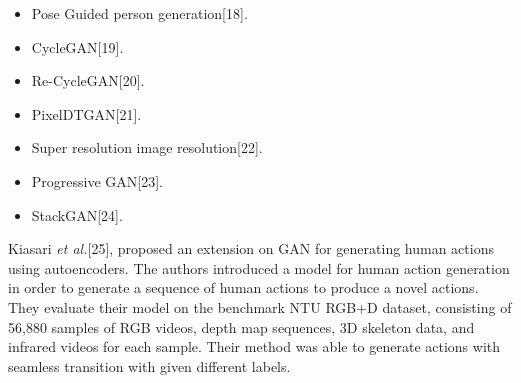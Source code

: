 \begin{itemize}
    \item Pose Guided person generation[18].
    \item CycleGAN[19].
    \item Re-CycleGAN[20].
    \item PixelDTGAN[21].
    \item Super resolution image resolution[22].
    \item Progressive GAN[23].
    \item StackGAN[24].
\end{itemize}
\hspace{5mm} Kiasari \textit{et al.}[25], proposed an extension on GAN for generating human actions using autoencoders. The authors introduced a model for human action generation in order to generate a sequence of human actions to produce a novel actions. They evaluate their model on the benchmark NTU RGB+D dataset, consisting of 56,880 samples of RGB videos, depth map sequences, 3D skeleton data, and infrared videos for each sample. Their method was able to generate actions with seamless transition with given different labels.
